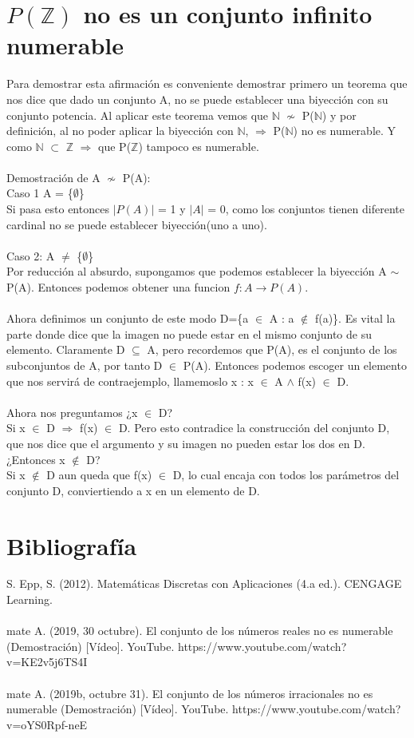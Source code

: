 \documentclass[]{article}
\begin{document}
\section*{$P(\mathbb{Z})$ no es un conjunto infinito numerable}
Para demostrar esta afirmación es conveniente demostrar primero un teorema que nos dice que dado un conjunto A, no se puede establecer una biyección con su conjunto potencia. Al aplicar este teorema vemos que $\mathbb{N}$ $\nsim$ P($\mathbb{N}$) y por definición, al no poder aplicar la biyección con $\mathbb{N}$, $\Rightarrow$ P($\mathbb{N}$) no es numerable. Y como $\mathbb{N}$ $\subset$ $\mathbb{Z}$ $\Rightarrow$ que P($\mathbb{Z}$) tampoco es numerable.\\\\
Demostración de A $\nsim$ P(A):\\ 
Caso 1 A = \{{$\emptyset$}\}\\
Si pasa esto entonces $\left|P(A)\right|$ = 1 y $\left|A\right|$ = 0, como los conjuntos tienen diferente cardinal no se puede establecer biyección(uno a uno).\\\\
Caso 2: A $\neq$ \{$\emptyset$\}\\
Por reducción al absurdo, supongamos que podemos establecer la biyección A $\sim$ P(A). Entonces podemos obtener una funcion $f: A \rightarrow P(A)$.\\\\ Ahora definimos un conjunto de este modo D=\{a $\in$ A : a $\notin$ f(a)\}. Es vital la parte donde dice que la imagen no puede estar en el mismo conjunto de su elemento. Claramente D $\subseteq$ A, pero recordemos que P(A), es el conjunto de los subconjuntos de A, por tanto D $\in$ P(A). Entonces podemos escoger un elemento que nos servirá de contraejemplo, llamemoslo x : x $\in$ A $\land $ f(x) $\in$ D. \\\\
Ahora nos preguntamos ¿x $\in$ D?\\
Si x $\in$ D $\Rightarrow$ f(x) $\in$ D. Pero esto contradice la construcción del conjunto D, que nos dice que el argumento y su imagen no pueden estar los dos en D.\\
¿Entonces x $\notin$ D?\\
Si x $\notin$ D aun queda que f(x) $\in$  D, lo cual encaja con todos los parámetros del conjunto D, conviertiendo a x en un elemento de D.

\section*{Bibliografía}
S. Epp, S. (2012). Matemáticas Discretas con Aplicaciones (4.a ed.). CENGAGE Learning. \\\\
mate A. (2019, 30 octubre). El conjunto de los números reales no es numerable (Demostración) [Vídeo]. YouTube. https://www.youtube.com/watch?v=KE2v5j6TS4I\\\\
mate A. (2019b, octubre 31). El conjunto de los números irracionales no es numerable (Demostración) [Vídeo]. YouTube. https://www.youtube.com/watch?v=oYS0Rpf-neE
\end{document}
